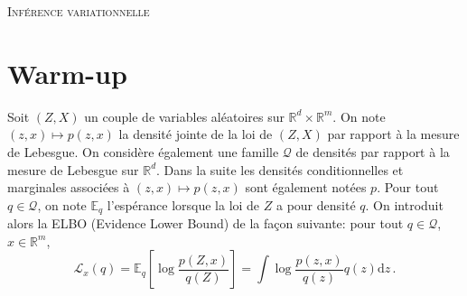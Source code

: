 \documentclass[a4paper,10pt,fleqn]{article}
\newcommand{\rset}{\ensuremath{\mathbb{R}}}
\newcommand{\1}{\ensuremath{\mathbbm{1}}}
\begin{document}

\noindent\hrulefill

\begin{center}
\textsc{Inf\'erence variationnelle}
\end{center}
\hrulefill

\medskip


\section{Warm-up}
Soit $(Z,X)$ un couple de variables al\'eatoires sur $\rset^d\times \rset^m$. On note $(z,x)\mapsto p(z,x)$ la densit\'e jointe de la loi de $(Z,X)$ par rapport \`a la mesure de Lebesgue. On consid\`ere \'egalement une famille $\mathcal{Q}$ de densit\'es par rapport \`a la mesure de Lebesgue sur $\rset^d$. Dans la suite les densit\'es conditionnelles et marginales associ\'ees \`a $(z,x)\mapsto p(z,x)$ sont \'egalement not\'ees $p$. Pour tout $q\in\mathcal{Q}$, on note $\mathbb{E}_q$ l'esp\'erance lorsque la loi de $Z$ a pour densit\'e $q$. On introduit alors la ELBO (Evidence Lower Bound) de la fa\c con suivante: pour tout $q\in\mathcal{Q}$, $x\in\rset^m$,
$$
\mathcal{L}_x(q) = \mathbb{E}_q\left[\log\frac{p(Z,x)}{q(Z)}\right] = \int \log\frac{p(z,x)}{q(z)}q(z) \mathrm{d} z\,.
$$
\end{document}
